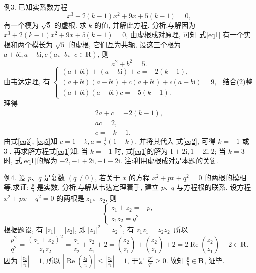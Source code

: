 例3. 已知实系数方程
$$
x^3+2(k-1) x^2+9 x+5(k-1)=0, \label{eq1}
$$
有一个模为 $\sqrt{5}$ 的虚根.
求 $k$ 的值, 并解此方程.
分析:与解因为 $x^3+2(k-1) x^2+9 x+5(k-1)=0$, 由虚根成对原理, 可知 式\ref{eq1} 有一个实根和两个模长为 $\sqrt{5}$ 的虚根, 它们互为共轭, 设这三个根为 $a+b \mathrm{i}, a-b \mathrm{i}, c(a 、 b 、 c \in \mathbf{R})$, 则
$$
a^2+b^2=5 . \label{eq2}
$$
由韦达定理, 有 $\left\{\begin{array}{l}(a+b \mathrm{i})+(a-b \mathrm{i})+c=-2(k-1), \\ (a+b \mathrm{i})(a-b \mathrm{i})+c(a+b \mathrm{i})+c(a-b \mathrm{i})=9, \\ (a+b \mathrm{i})(a-b \mathrm{i}) c=-5(k-1) .\end{array}\right.$
结合(2)整理得
$$
\begin{gathered}
2 a+c=-2(k-1), \label{eq3} \\
a c=2, \label{eq4}\\
c=-k+1 . \label{eq5}
\end{gathered}
$$
由式\ref{eq3}, \ref{eq5}知 $c=1-k, a=\frac{1}{2}(1-k)$, 并将其代入 式\ref{eq2}, 可得 $k=-1$ 或 3 .
再求解方程式\ref{eq1}知: 当 $k=-1$ 时, 式\ref{eq1}的解为 $1+2 \mathrm{i}, 1-2 \mathrm{i}, 2$; 当 $k=3$ 时, 式\ref{eq1}的解为 $-2,-1+2 \mathrm{i},-1-2 \mathrm{i}$.
注:利用虚根成对是本题的关键.



例4. 设 $p 、 q$ 是复数 $(q \neq 0)$, 若关于 $x$ 的方程 $x^2+p x+q^2=0$ 的两根的模相等,求证: $\frac{p}{q}$ 是实数.
分析:与解从韦达定理着手, 建立 $p 、 q$ 与方程根的联系.
设方程 $x^2+p x+q^2=0$ 的两根是 $z_1 、 z_2$, 则
$$
\left\{\begin{array}{l}
z_1+z_2=-p, \\
z_1 z_2=q^2
\end{array}\right.
$$
根据题设, 有 $\left|z_1\right|=\left|z_2\right|$, 即 $\left|z_1\right|^2=\left|z_2\right|^2$, 有 $z_1 \overline{z_1}=z_2 \overline{z_2}$, 所以
$$
\frac{p^2}{q^2}=\frac{\left(z_1+z_2\right)^2}{z_1 z_2}=\frac{z_1}{z_2}+\frac{z_2}{z_1}+2=\overline{\left(\frac{z_2}{z_1}\right)}+\left(\frac{z_2}{z_1}\right)+2=2 \operatorname{Re}\left(\frac{z_2}{z_1}\right)+2 \in \mathbf{R} .
$$
因为 $\left|\frac{z_2}{z_1}\right|=1$, 所以 $\left|\operatorname{Re}\left(\frac{z_2}{z_1}\right)\right| \leqslant\left|\frac{z_2}{z_1}\right|=1$, 于是 $\frac{p^2}{q^2} \geqslant 0$. 故知 $\frac{p}{q} \in \mathbf{R}$, 证毕.



